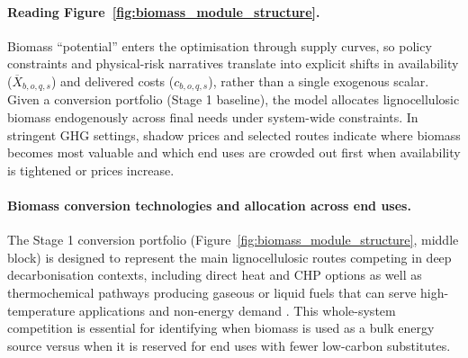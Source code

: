 \documentclass{article}
\begin{document}
\paragraph{Reading Figure~\ref{fig:biomass_module_structure}.}
Biomass ``potential'' enters the optimisation through supply curves, so policy constraints and physical-risk narratives translate into explicit shifts in availability (\(\overline{X}_{b,o,q,s}\)) and delivered costs (\(c_{b,o,q,s}\)), rather than a single exogenous scalar. Given a conversion portfolio (Stage 1 baseline), the model allocates lignocellulosic biomass endogenously across final needs under system-wide constraints. In stringent GHG settings, shadow prices and selected routes indicate where biomass becomes most valuable and which end uses are crowded out first when availability is tightened or prices increase.

\paragraph{Biomass conversion technologies and allocation across end uses.}
The Stage 1 conversion portfolio (Figure~\ref{fig:biomass_module_structure}, middle block) is designed to represent the main lignocellulosic routes competing in deep decarbonisation contexts, including direct heat and CHP options as well as thermochemical pathways producing gaseous or liquid fuels that can serve high-temperature applications and non-energy demand \citep{collaOptimalUseLignocellulosic2022}. This whole-system competition is essential for identifying when biomass is used as a bulk energy source versus when it is reserved for end uses with fewer low-carbon substitutes.
\end{document}
